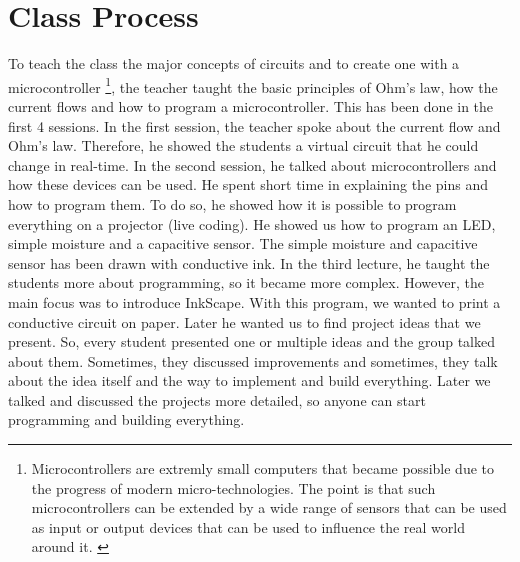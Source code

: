 \documentclass[doc.tex]{subfiles}
\begin{document}
    \section{Class Process}
    \begin{flushleft}
        To teach the class the major concepts of circuits and to create one with a microcontroller {\footnote{\label{foot:
        microcontroller} Microcontrollers are extremly small computers that became possible due to the progress of modern 
        micro-technologies. The point is that such microcontrollers can be extended by a wide range of sensors that can 
        be used as input or output devices that can be used to influence the real world around it. \cite{Schief1997, 
        Dembowski2014}}}, the teacher taught the basic principles of Ohm's law, how the current flows and how to program 
        a microcontroller. This has been done in the first 4 sessions.\newline
        In the first session, the teacher spoke about the current flow and Ohm's law. Therefore, he showed the students
        a virtual circuit that he could change in real-time.\newline
        In the second session, he talked about microcontrollers and how these devices can be used. He spent short
        time in explaining the pins and how to program them. To do so, he showed how it is possible to program
        everything on a projector (live coding). He showed us how to program an LED, simple moisture and 
        a capacitive sensor. The simple moisture and capacitive sensor has been drawn with conductive ink.\newline
        In the third lecture, he taught the students more about programming, so it became more complex. However, 
        the main focus was to introduce InkScape. With this program, we wanted to print a conductive circuit on paper.\newline
        Later he wanted us to find project ideas that we present. So, every student presented one or multiple ideas and
        the group talked about them. Sometimes, they discussed improvements and sometimes, they talk about the idea itself
        and the way to implement and build everything.
        Later we talked and discussed the projects more detailed, so anyone can start programming and building everything.
    \end{flushleft}
\end{document}
